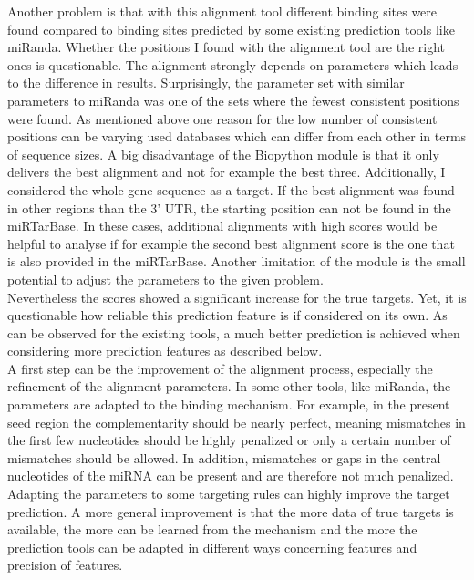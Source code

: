 \documentclass[12pt,  a4paper]{report}
\begin{document}
Another problem is that with this alignment tool different binding sites were found compared to binding sites predicted by some existing prediction tools like miRanda. Whether the positions I found with the alignment tool are the right ones is questionable. The alignment strongly depends on parameters which leads to the difference in results. Surprisingly, the parameter set with similar parameters to miRanda was one of the sets where the fewest consistent positions were found. As mentioned above one reason for the low number of consistent positions can be varying used databases which can differ from each other in terms of sequence sizes. A big disadvantage of the Biopython module is that it only delivers the best alignment and not for example the best three. Additionally, I considered the whole gene sequence as a target. If the best alignment was found in other regions than the 3' UTR, the starting position can not be found in the miRTarBase. In these cases, additional alignments with high scores would be helpful to analyse if for example the second best alignment score is the one that is also provided in the miRTarBase. Another limitation of the module is the small potential to adjust the parameters to the given problem. \\

Nevertheless the scores showed a significant increase for the true targets. Yet, it is questionable how reliable this prediction feature is if considered on its own. As can be observed for the existing tools, a much better prediction is achieved when considering more prediction features as described below.\\

A first step can be the improvement of the alignment process, especially the refinement of the alignment parameters. In some other tools, like miRanda, the parameters are adapted to the binding mechanism. For example, in the present seed region the complementarity should be nearly perfect, meaning mismatches in the first few nucleotides should be highly penalized or only a certain number of mismatches should be allowed. In addition, mismatches or gaps in the central nucleotides of the miRNA can be present and are therefore not much penalized. Adapting the parameters to some targeting rules can highly improve the target prediction. A more general improvement is that the more data of true targets is available, the more can be learned from the mechanism and the more the prediction tools can be adapted in different ways concerning features and precision of features.\\
\end{document}
